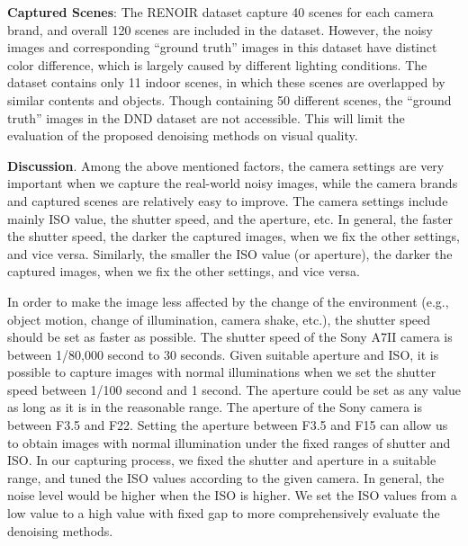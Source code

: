 \textbf{Captured Scenes}: The RENOIR dataset \cite{RENOIR2014} capture 40 scenes for each camera brand, and overall 120 scenes are included in the dataset. However, the noisy images and corresponding ``ground truth'' images in this dataset have distinct color difference, which is largely caused by different lighting conditions. The dataset \cite{crosschannel2016} contains only 11 indoor scenes, in which these scenes are overlapped by similar contents and objects. Though containing 50 different scenes, the ``ground truth'' images in the DND dataset \cite{dnd2017} are not accessible. This will limit the evaluation of the proposed denoising methods on visual quality.


\textbf{Discussion}. Among the above mentioned factors, the camera settings are very important when we capture the real-world noisy images, while the camera brands and captured scenes are relatively easy to improve. The camera settings include mainly ISO value, the shutter speed, and the aperture, etc. In general, the faster the shutter speed, the darker the captured images, when we fix the other settings, and vice versa. Similarly, the smaller the ISO value (or aperture), the darker the captured images, when we fix the other settings, and vice versa. 

In order to make the image less affected by the change of the environment (e.g., object motion, change of illumination, camera shake, etc.), the shutter speed should be set as faster as possible. The shutter speed of the Sony A7II camera is between 1/80,000 second to 30 seconds. Given suitable aperture and ISO, it is possible to capture images with normal illuminations when we set the shutter speed between 1/100 second and 1 second. The aperture could be set as any value as long as it is in the reasonable range. The aperture of the Sony camera is between F3.5 and F22. Setting the aperture between F3.5 and F15 can allow us to obtain images with normal illumination under the fixed ranges of shutter and ISO. In our capturing process, we fixed the shutter and aperture in a suitable range, and tuned the ISO values according to the given camera. In general, the noise level would be higher when the ISO is higher. We set the ISO values from a low value to a high value with fixed gap to more comprehensively evaluate the denoising methods.

